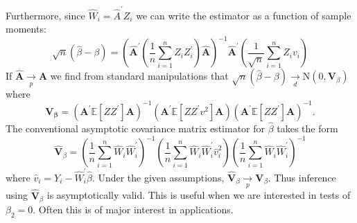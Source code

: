 \documentclass[10pt]{article}
\begin{document}
Furthermore, since $\widehat{W}_{i}=\widehat{A}^{\prime} Z_{i}$ we can write the estimator as a function of sample moments:
$$
\sqrt{n}(\widehat{\beta}-\beta)=\left(\widehat{\boldsymbol{A}}^{\prime}\left(\frac{1}{n} \sum_{i=1}^{n} Z_{i} Z_{i}^{\prime}\right) \widehat{\boldsymbol{A}}\right)^{-1} \widehat{\boldsymbol{A}}^{\prime}\left(\frac{1}{\sqrt{n}} \sum_{i=1}^{n} Z_{i} v_{i}\right)
$$
If $\widehat{\boldsymbol{A}} \underset{p}{\longrightarrow} \boldsymbol{A}$ we find from standard manipulations that $\sqrt{n}(\widehat{\beta}-\beta) \underset{d}{\longrightarrow} \mathrm{N}\left(0, \boldsymbol{V}_{\beta}\right)$ where
$$
\boldsymbol{V}_{\boldsymbol{\beta}}=\left(\boldsymbol{A}^{\prime} \mathbb{E}\left[Z Z^{\prime}\right] \boldsymbol{A}\right)^{-1}\left(\boldsymbol{A}^{\prime} \mathbb{E}\left[Z Z^{\prime} v^{2}\right] \boldsymbol{A}\right)\left(\boldsymbol{A}^{\prime} \mathbb{E}\left[Z Z^{\prime}\right] \boldsymbol{A}\right)^{-1} .
$$
The conventional asymptotic covariance matrix estimator for $\widehat{\beta}$ takes the form
$$
\widehat{\boldsymbol{V}}_{\beta}=\left(\frac{1}{n} \sum_{i=1}^{n} \widehat{W}_{i} \widehat{W}_{i}^{\prime}\right)^{-1}\left(\frac{1}{n} \sum_{i=1}^{n} \widehat{W}_{i} \widehat{W}_{i}^{\prime} \widehat{v}_{i}^{2}\right)\left(\frac{1}{n} \sum_{i=1}^{n} \widehat{W}_{i} \widehat{W}_{i}^{\prime}\right)^{-1}
$$
where $\widehat{v}_{i}=Y_{i}-\widehat{W}_{i}^{\prime} \widehat{\beta}$. Under the given assumptions, $\widehat{\boldsymbol{V}}_{\beta} \underset{p}{\longrightarrow} \boldsymbol{V}_{\beta}$. Thus inference using $\widehat{\boldsymbol{V}}_{\beta}$ is asymptotically valid. This is useful when we are interested in tests of $\beta_{2}=0$. Often this is of major interest in applications.
\end{document}
